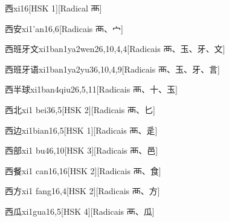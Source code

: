 \begin{entry}{西}{xi1}{6}[HSK 1][Radical ⾑]
\end{entry}

\begin{entry}{西安}{xi1'an1}{6,6}[Radicais ⾑、⼧]
\end{entry}

\begin{entry}{西班牙文}{xi1ban1ya2wen2}{6,10,4,4}[Radicais ⾑、⽟、⽛、⽂]
\end{entry}

\begin{entry}{西班牙语}{xi1ban1ya2yu3}{6,10,4,9}[Radicais ⾑、⽟、⽛、⾔]
\end{entry}

\begin{entry}{西半球}{xi1ban4qiu2}{6,5,11}[Radicais ⾑、⼗、⽟]
\end{entry}

\begin{entry}{西北}{xi1 bei3}{6,5}[HSK 2][Radicais ⾑、⼔]
\end{entry}

\begin{entry}{西边}{xi1bian1}{6,5}[HSK 1][Radicais ⾑、⾡]
\end{entry}

\begin{entry}{西部}{xi1 bu4}{6,10}[HSK 3][Radicais ⾑、⾢]
\end{entry}

\begin{entry}{西餐}{xi1 can1}{6,16}[HSK 2][Radicais ⾑、⾷]
\end{entry}

\begin{entry}{西方}{xi1 fang1}{6,4}[HSK 2][Radicais ⾑、⽅]
\end{entry}

\begin{entry}{西瓜}{xi1gua1}{6,5}[HSK 4][Radicais ⾑、⽠]
\end{entry}

